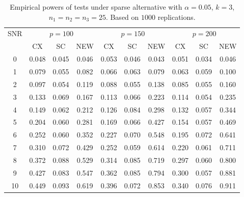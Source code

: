 \documentclass[review]{elsarticle}
\theoremstyle{plain}
\theoremstyle{definition}
\theoremstyle{remark}
\begin{document}
\begin{table}[!hbp]
    \caption{Empirical powers of tests under sparse alternative with $\alpha=0.05$, $k=3$, $n_1=n_2=n_3=25$. Based on $1000$ replications.}
    \centering
\begin{tabular}{*{10}{c}}
\toprule
\multirow{2}{*}{SNR} &\multicolumn{3}{c}{$p=100$}&\multicolumn{3}{c}{$p=150$}&\multicolumn{3}{c}{$p=200$} \\
    \cmidrule(r){2-4}\cmidrule(r){5-7}\cmidrule(r){8-10}
        & CX & SC & NEW & CX &SC &NEW &CX & SC & NEW\\
\midrule
0 & 0.048 & 0.045 & 0.046 & 0.053 & 0.046 & 0.043 & 0.051 & 0.034 & 0.046 \\ 
1 & 0.079 & 0.055 & 0.082 & 0.066 & 0.063 & 0.079 & 0.063 & 0.059 & 0.100 \\ 
2 & 0.097 & 0.054 & 0.119 & 0.088 & 0.055 & 0.138 & 0.085 & 0.055 & 0.160 \\ 
3 & 0.133 & 0.069 & 0.167 & 0.113 & 0.066 & 0.223 & 0.114 & 0.054 & 0.235 \\ 
4 & 0.149 & 0.062 & 0.212 & 0.126 & 0.084 & 0.298 & 0.132 & 0.057 & 0.344 \\ 
5 & 0.204 & 0.060 & 0.281 & 0.169 & 0.066 & 0.427 & 0.154 & 0.057 & 0.469 \\ 
6 & 0.252 & 0.060 & 0.352 & 0.227 & 0.070 & 0.548 & 0.195 & 0.072 & 0.641 \\ 
7 & 0.310 & 0.072 & 0.429 & 0.252 & 0.059 & 0.614 & 0.220 & 0.061 & 0.711 \\ 
8 & 0.372 & 0.088 & 0.529 & 0.314 & 0.085 & 0.719 & 0.297 & 0.060 & 0.800 \\ 
9 & 0.427 & 0.083 & 0.547 & 0.362 & 0.085 & 0.794 & 0.300 & 0.057 & 0.881 \\ 
10 & 0.449 & 0.093 & 0.619 & 0.396 & 0.072 & 0.853 & 0.340 & 0.076 & 0.911 \\ 
\bottomrule
\end{tabular}
\end{table}
\end{document}
